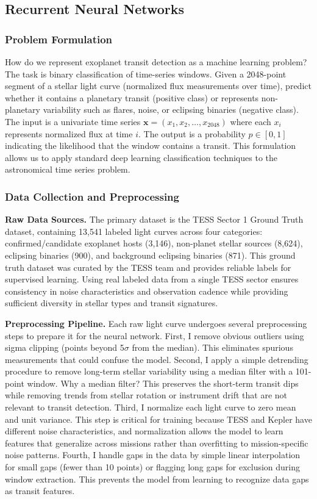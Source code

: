 \documentclass[letterpaper]{article} %
\begin{document}
\subsection{Recurrent Neural Networks}
\subsubsection{Problem Formulation}
How do we represent exoplanet transit detection as a machine learning problem? The task is binary classification of time-series windows. Given a 2048-point segment of a stellar light curve (normalized flux measurements over time), predict whether it contains a planetary transit (positive class) or represents non-planetary variability such as flares, noise, or eclipsing binaries (negative class). The input is a univariate time series $\mathbf{x} = (x_1, x_2, \ldots, x_{2048})$ where each $x_i$ represents normalized flux at time $i$. The output is a probability $p \in [0,1]$ indicating the likelihood that the window contains a transit. This formulation allows us to apply standard deep learning classification techniques to the astronomical time series problem.

\subsubsection{Data Collection and Preprocessing}
\textbf{Raw Data Sources.} The primary dataset is the TESS Sector 1 Ground Truth dataset, containing 13,541 labeled light curves across four categories: confirmed/candidate exoplanet hosts (3,146), non-planet stellar sources (8,624), eclipsing binaries (900), and background eclipsing binaries (871). This ground truth dataset was curated by the TESS team and provides reliable labels for supervised learning. Using real labeled data from a single TESS sector ensures consistency in noise characteristics and observation cadence while providing sufficient diversity in stellar types and transit signatures.

\textbf{Preprocessing Pipeline.} Each raw light curve undergoes several preprocessing steps to prepare it for the neural network. First, I remove obvious outliers using sigma clipping (points beyond 5$\sigma$ from the median). This eliminates spurious measurements that could confuse the model. Second, I apply a simple detrending procedure to remove long-term stellar variability using a median filter with a 101-point window. Why a median filter? This preserves the short-term transit dips while removing trends from stellar rotation or instrument drift that are not relevant to transit detection. Third, I normalize each light curve to zero mean and unit variance. This step is critical for training because TESS and Kepler have different noise characteristics, and normalization allows the model to learn features that generalize across missions rather than overfitting to mission-specific noise patterns. Fourth, I handle gaps in the data by simple linear interpolation for small gaps (fewer than 10 points) or flagging long gaps for exclusion during window extraction. This prevents the model from learning to recognize data gaps as transit features.
\end{document}
